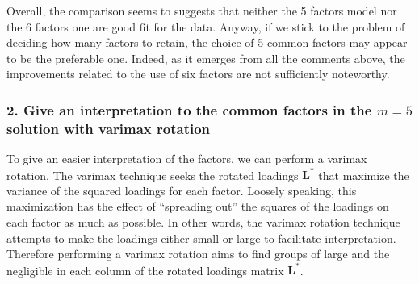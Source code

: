 \documentclass[
  letterpaper,
  DIV=11,
  numbers=noendperiod]{scrartcl}
\newenvironment{Shaded}{\begin{snugshade}}{\end{snugshade}}
\newcommand{\AttributeTok}[1]{\textcolor[rgb]{0.40,0.45,0.13}{#1}}
\newcommand{\DecValTok}[1]{\textcolor[rgb]{0.68,0.00,0.00}{#1}}
\newcommand{\FloatTok}[1]{\textcolor[rgb]{0.68,0.00,0.00}{#1}}
\newcommand{\FunctionTok}[1]{\textcolor[rgb]{0.28,0.35,0.67}{#1}}
\newcommand{\NormalTok}[1]{\textcolor[rgb]{0.00,0.23,0.31}{#1}}
\newcommand{\OtherTok}[1]{\textcolor[rgb]{0.00,0.23,0.31}{#1}}
\newcommand{\SpecialCharTok}[1]{\textcolor[rgb]{0.37,0.37,0.37}{#1}}
\newcommand{\StringTok}[1]{\textcolor[rgb]{0.13,0.47,0.30}{#1}}
\begin{document}
Overall, the comparison seems to suggests that neither the 5 factors
model nor the 6 factors one are good fit for the data. Anyway, if we
stick to the problem of deciding how many factors to retain, the choice
of 5 common factors may appear to be the preferable one. Indeed, as it
emerges from all the comments above, the improvements related to the use
of six factors are not sufficiently noteworthy.

\hypertarget{give-an-interpretation-to-the-common-factors-in-the-m-5-solution-with-varimax-rotation}{%
\subsubsection{\texorpdfstring{2. Give an interpretation to the common
factors in the \(m = 5\) solution with varimax
rotation}{2. Give an interpretation to the common factors in the m = 5 solution with varimax rotation}}\label{give-an-interpretation-to-the-common-factors-in-the-m-5-solution-with-varimax-rotation}}

To give an easier interpretation of the factors, we can perform a
varimax rotation. The varimax technique seeks the rotated loadings
\(\mathbf{L}^*\) that maximize the variance of the squared loadings for
each factor. Loosely speaking, this maximization has the effect of
``spreading out'' the squares of the loadings on each factor as much as
possible. In other words, the varimax rotation technique attempts to
make the loadings either small or large to facilitate interpretation.
Therefore performing a varimax rotation aims to find groups of large and
the negligible in each column of the rotated loadings matrix
\(\mathbf{L}^*\).

\begin{Shaded}
\end{Shaded}
\end{document}
